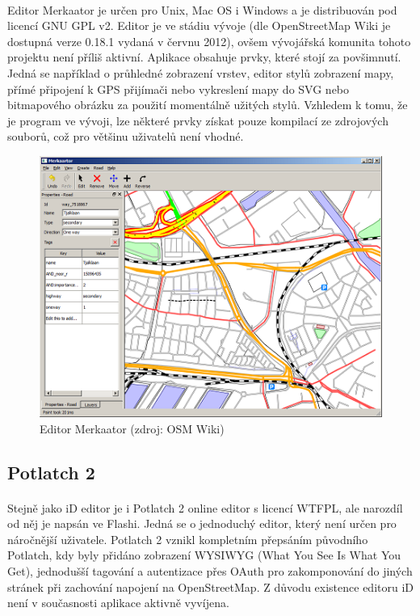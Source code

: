 \documentclass[11pt,a4paper,titlepage,oneside]{book}
\begin{document}
			\paragraph{} Editor Merkaator je určen pro Unix, Mac OS i Windows a je distribuován pod licencí GNU GPL v2. Editor je ve stádiu vývoje (dle OpenStreetMap Wiki je dostupná verze 0.18.1 vydaná v červnu 2012), ovšem vývojářská komunita tohoto projektu není příliš aktivní. Aplikace obsahuje prvky, které stojí za povšimnutí. Jedná se například o průhledné zobrazení vrstev, editor stylů zobrazení mapy, přímé připojení k GPS přijímači nebo vykreslení mapy do SVG nebo bitmapového obrázku za použití momentálně užitých stylů. Vzhledem k tomu, že je program ve vývoji, lze některé prvky získat pouze kompilací ze zdrojových souborů, což pro většinu uživatelů není vhodné.

		\begin{figure}[!h]
			\begin{center}
				\includegraphics[width=12cm]{obrazky/merkaator_osm.png}
				\caption{Editor Merkaator (zdroj: OSM Wiki\cite{wiki_merkaator})}
			\end{center}
		\end{figure}

		\subsection{Potlatch 2}
			\paragraph{} Stejně jako iD editor je i Potlatch 2 online editor s licencí WTFPL, ale narozdíl od něj je napsán ve Flashi. Jedná se o jednoduchý editor, který není určen pro náročnější uživatele. Potlatch 2 vznikl kompletním přepsáním původního Potlatch, kdy byly přidáno zobrazení WYSIWYG (What You See Is What You Get), jednodušší tagování a autentizace přes OAuth pro zakomponování do jiných stránek při zachování napojení na OpenStreetMap. Z důvodu existence editoru iD není v současnosti aplikace aktivně vyvíjena.
\end{document}
